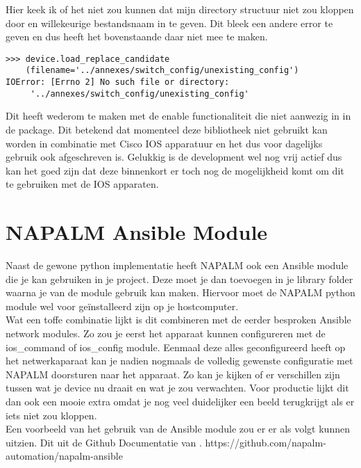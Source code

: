 Hier keek ik of het niet zou kunnen dat mijn directory structuur niet zou kloppen door en willekeurige bestandsnaam in te geven. Dit bleek een andere error te geven en dus heeft het bovenstaande daar niet mee te maken.

\begin{center}
\begin{BVerbatim}
>>> device.load_replace_candidate
    (filename='../annexes/switch_config/unexisting_config')
IOError: [Errno 2] No such file or directory: 
     '../annexes/switch_config/unexisting_config'
\end{BVerbatim}
\end{center}

Dit heeft wederom te maken met de enable functionaliteit die niet aanwezig in in de package. Dit betekend dat momenteel deze bibliotheek niet gebruikt kan worden in combinatie met Cisco IOS apparatuur en het dus voor dagelijks gebruik ook afgeschreven is. Gelukkig is de development wel nog vrij actief dus kan het goed zijn dat deze binnenkort er toch nog de mogelijkheid komt om dit te gebruiken met de IOS apparaten.

\section{NAPALM Ansible Module}
\label{ch:napalmansible}
Naast de gewone python implementatie heeft NAPALM ook een Ansible module die je kan gebruiken in je project. Deze moet je dan toevoegen in je library folder waarna je van de module gebruik kan maken. Hiervoor moet de NAPALM python module wel voor geïnstalleerd zijn op je hostcomputer. 
\\

Wat een toffe combinatie lijkt is dit combineren met de eerder besproken Ansible network modules. Zo zou je eerst het apparaat kunnen configureren met de ios\_command of ios\_config module. Eenmaal deze alles geconfigureerd heeft op het netwerkaparaat kan je nadien nogmaals de volledig gewenste configuratie met NAPALM doorsturen naar het apparaat. Zo kan je kijken of er verschillen zijn tussen wat je device nu draait en wat je zou verwachten. Voor productie lijkt dit dan ook een mooie extra omdat je nog veel duidelijker een beeld terugkrijgt als er iets niet zou kloppen.
\\

Een voorbeeld van het gebruik van de Ansible module zou er er als volgt kunnen uitzien. Dit uit de Github Documentatie van \cite{githubnabalmansible}. https://github.com/napalm-automation/napalm-ansible

